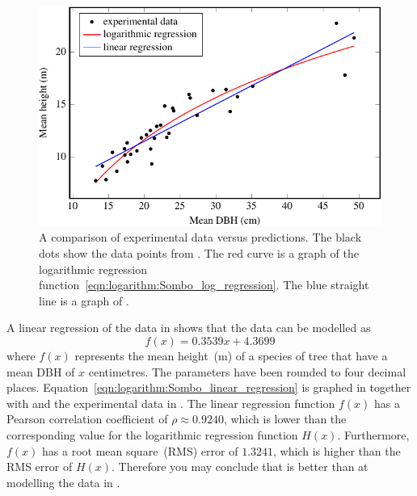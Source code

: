 \documentclass[a4paper,oneside,12pt]{article}
\begin{document}
{\begin{solution}
\begin{figure}[!htbp]
\centering
\includegraphics[scale=1.1]{image/12/sombo.pdf}
\caption{%
  A comparison of experimental data versus predictions.  The black
  dots show the data points from .  The red
  curve is a graph of the logarithmic regression
  function~\eqref{eqn:logarithm:Sombo_log_regression}.  The blue
  straight line is a graph of
  .
}
\label{fig:logarithm:Sombo_log_regression}
\end{figure}

A linear regression of the data in  shows
that the data can be modelled as
\begin{equation}
\label{eqn:logarithm:Sombo_linear_regression}
f(x)
=
0.3539 x + 4.3699
\end{equation}
where $f(x)$ represents the mean height~(m) of a species of tree that
have a mean DBH of $x$ centimetres.  The parameters have been rounded
to four decimal places.
Equation~\eqref{eqn:logarithm:Sombo_linear_regression} is graphed in
 together with
 and the experimental
data in .  The linear regression function
$f(x)$ has a Pearson correlation coefficient of $\rho \approx 0.9240$,
which is lower than the corresponding value for the logarithmic
regression function $H(x)$.  Furthermore, $f(x)$ has a root mean
square~(RMS) error of $1.3241$, which is higher than the RMS error of
$H(x)$.  Therefore you may conclude that
 is better than
 at modelling the data
in .
\end{solution}
}{}
\end{document}
